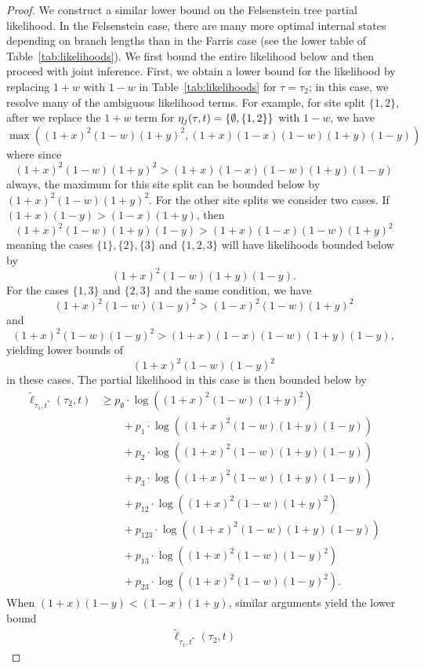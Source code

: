 \begin{proof}
We construct a similar lower bound on the Felsenstein tree partial likelihood.
In the Felsenstein case, there are many more optimal internal states depending on branch lengths than in the Farris case (see the lower table of Table~\ref{tab:likelihoods}).
We first bound the entire likelihood below and then proceed with joint inference.
First, we obtain a lower bound for the likelihood by replacing $1+w$ with $1-w$ in Table~\ref{tab:likelihoods} for $\tau = \tau_2$; in this case, we resolve many of the ambiguous likelihood terms.
For example, for site split $\{1,2\}$, after we replace the $1+w$ term for $\eta_j(\tau, t)=\{\emptyset, \{1,2\}\}$ with $1-w$, we have
$$
\max\left((1+x)^2 (1-w)(1+y)^2, (1+x)(1-x)(1-w)(1+y)(1-y)\right)
$$
where since
$$
(1+x)^2 (1-w)(1+y)^2 > (1+x)(1-x)(1-w)(1+y)(1-y)
$$
always, the maximum for this site split can be bounded below by $(1+x)^2 (1-w)(1+y)^2$.
For the other site splits we consider two cases.
If $(1+x)(1-y) > (1-x)(1+y)$, then
$$
(1+x)^2(1-w)(1+y)(1-y) > (1+x)(1-x)(1-w)(1+y)^2
$$
meaning the cases $\{1\}, \{2\}, \{3\}$ and $\{1,2,3\}$ will have likelihoods bounded below by
$$
(1+x)^2(1-w)(1+y)(1-y).
$$
For the cases $\{1,3\}$ and $\{2,3\}$ and the same condition, we have
$$
(1+x)^2(1-w)(1-y)^2 > (1-x)^2(1-w)(1+y)^2
$$
and
$$
(1+x)^2(1-w)(1-y)^2 > (1+x)(1-x)(1-w)(1+y)(1-y),
$$
yielding lower bounds of
$$
(1+x)^2(1-w)(1-y)^2
$$
in these cases.
The partial likelihood in this case is then bounded below by
\begin{align*}
    \tilde{\ell}_{\tau_1,t^*}(\tau_2, t)
    &\ge      p_{\emptyset}  \cdot\log((1+x)^2   (1-w)(1+y)^2) \\
    &\qquad + p_{1}          \cdot\log((1+x)^2   (1-w)(1+y)(1-y)) \\
    &\qquad + p_{2}          \cdot\log((1+x)^2   (1-w)(1+y)(1-y)) \\
    &\qquad + p_{3}          \cdot\log((1+x)^2   (1-w)(1+y)(1-y)) \\
    &\qquad + p_{12}         \cdot\log((1+x)^2   (1-w)(1+y)^2) \\
    &\qquad + p_{123}        \cdot\log((1+x)^2   (1-w)(1+y)(1-y))\\
    &\qquad + p_{13}         \cdot\log((1+x)^2   (1-w)(1-y)^2) \\
    &\qquad + p_{23}         \cdot\log((1+x)^2   (1-w)(1-y)^2).
\end{align*}
When $(1+x)(1-y) < (1-x)(1+y)$, similar arguments yield the lower bound
\begin{align*}
    \tilde{\ell}_{\tau_1,t^*}(\tau_2, t)

\end{align*}
\end{proof}
